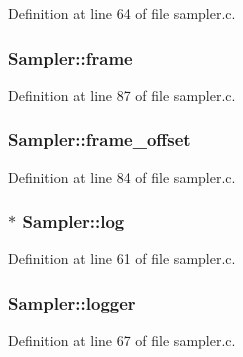 Definition at line 64 of file sampler.\+c.

\subsubsection[{\texorpdfstring{frame}{frame}}]{ Sampler\+::frame}\hypertarget{struct_sampler_a74b10f8039d2b17872e372c77ac878e0}{}\label{struct_sampler_a74b10f8039d2b17872e372c77ac878e0}


Definition at line 87 of file sampler.\+c.

\subsubsection[{\texorpdfstring{frame\+\_\+offset}{frame_offset}}]{ Sampler\+::frame\+\_\+offset}\hypertarget{struct_sampler_a8a85575dd4605c7b455b7f7a4524df6c}{}\label{struct_sampler_a8a85575dd4605c7b455b7f7a4524df6c}


Definition at line 84 of file sampler.\+c.

\subsubsection[{\texorpdfstring{log}{log}}]{$\ast$ Sampler\+::log}\hypertarget{struct_sampler_a4444199f1dd08ec7ebde6103947d08f1}{}\label{struct_sampler_a4444199f1dd08ec7ebde6103947d08f1}


Definition at line 61 of file sampler.\+c.

\subsubsection[{\texorpdfstring{logger}{logger}}]{ Sampler\+::logger}\hypertarget{struct_sampler_a9dcaeef536e632b1a4476256cda55554}{}\label{struct_sampler_a9dcaeef536e632b1a4476256cda55554}


Definition at line 67 of file sampler.\+c.

